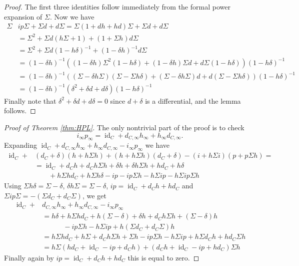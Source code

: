 \documentclass[11pt,reqno]{amsart}
\def\id {{\operatorname{id}}}
\theoremstyle{definition}
\numberwithin{equation}{section}
\begin{document}
\begin{proof}
    The first three identities follow immediately from the formal power expansion of $\Sigma$. Now we have
    \begin{align*}
        \Sigma & i p \Sigma + \Sigma d + d \Sigma  = \Sigma(1+ d h + h d) \Sigma + \Sigma d + d \Sigma \\
        & = \Sigma^2 + \Sigma d(h\Sigma + 1) + (1+\Sigma h)d\Sigma \\
        & = \Sigma^2 + \Sigma d(1-h\delta)^{-1} + (1-\delta h)^{-1}d\Sigma \\
        & = (1-\delta h)^{-1}\left( (1-\delta h) \Sigma^2 (1-h\delta) + (1-\delta h)\Sigma d + d\Sigma (1-h\delta) \right) (1-h\delta)^{-1}\\
        & = (1-\delta h)^{-1}\left( (\Sigma-\delta h \Sigma) (\Sigma- \Sigma h\delta) + (\Sigma-\delta h \Sigma) d + d (\Sigma-\Sigma h\delta) \right) (1-h\delta)^{-1} \\
        & = (1-\delta h)^{-1}\left( \delta^2 + \delta d + d \delta \right) (1-h\delta)^{-1}
    \end{align*}
    Finally note that $\delta^2 + \delta d + d \delta = 0$ since $d+\delta$ is a differential, and the lemma follows.
\end{proof}

\begin{proof}[Proof of Theorem \ref{thm:HPL}]
    The only nontrivial part of the proof is to check $$i_{\infty}p_{\infty} = \id_{C} + d_{C,\infty} h_{\infty} + h_{\infty} d_{C,\infty}.$$ 
    Expanding $\id_{C} + d_{C,\infty} h_{\infty} + h_{\infty} d_{C,\infty} - i_{\infty}p_{\infty}$ we have
    \begin{align*}
        \id_C + &(d_C + \delta)(h + h\Sigma h) + (h + h\Sigma h)(d_C + \delta) - (i + h\Sigma i)(p + p\Sigma h)  = \\
        &= \id_C + d_C h + d_C h \Sigma h + \delta h + \delta h \Sigma h + h d_C + h \delta \\
        &\qquad + h \Sigma h d_C + h \Sigma h \delta - ip - ip\Sigma h - h\Sigma ip - h\Sigma ip \Sigma h 
    \end{align*}
    Using $\Sigma h\delta = \Sigma - \delta$, $\delta h \Sigma = \Sigma - \delta$, $ip = \id_C +d_C h + h d_C$ and $\Sigma ip \Sigma = -(\Sigma d_C + d_C \Sigma)$, we get
    \begin{align*}
        \id_{C} + & d_{C,\infty} h_{\infty} + h_{\infty} d_{C,\infty} - i_{\infty}p_{\infty} \\
        &= h \delta + h\Sigma h d_C +  h(\Sigma-\delta) + \delta h + d_C h \Sigma h + (\Sigma - \delta)h \\
        &\qquad\quad - ip\Sigma h - h\Sigma ip + h(\Sigma d_C + d_C \Sigma)h \\
        &=h\Sigma h d_C + h\Sigma + d_C h \Sigma h + \Sigma h - ip \Sigma h - h\Sigma ip + h\Sigma d_C h + h d_C\Sigma h \\
        &=h\Sigma(hd_C + \id_C - ip + d_C h) + (d_C h + \id_C - ip + h d_C)\Sigma h
    \end{align*}
    Finally again by $ip = \id_C + d_C h + h d_C$ this is equal to zero.
\end{proof}
\end{document}
